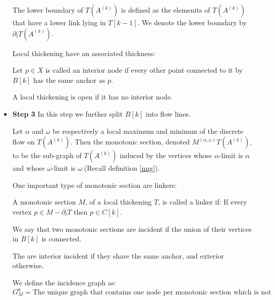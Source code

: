 \begin{itemize}
\begin{definition}
            The lower boundary of $T(A^{(k)})$
            is defined as the elemenits of $T(A^{(k)})$ that have a lower link lying in $T[k-1]$.
            We denote the lower boundary by $\partial_l T(A^{(k)})$.
        \end{definition}

        Local thickening have an associated thickness:

        \begin{definition}
            Let $p\in X$ is called an interior node if every other point connected 
            to it by $B[k]$ has the same anchor as $p$.

            A local thickening is open if it has no interior node.
        \end{definition}

    \item {\bf Step 3}
        In this step we further split $B[k]$ into flow lines.

        \begin{definition}
           Let $\alpha$ and $\omega$ be respectively a local maximum and minimun of 
            the discrete flow on $T(A^{(k)})$.
            Then the monotonic section, denoted $M^{
            (\alpha,\omega)
            }
            T(A^{(k)})$,
           to be the sub-graph of $T(A^{(k)})$ induced by the vertices whose
            $\alpha$-limit is $\alpha$ and whose $\omega$-limit is $\omega$.(Recall definition \ref{nng}).
        \end{definition}

        One important type of monotonic section are linkers:

        \begin{definition}[Linker]
            A monotonic section $M$, of a local thickening $T$, is called a linker if:
            If every vertex $p\in M-\partial_l T$ then $p\in C[k]$.
        \end{definition}
        
        
        \begin{definition}
            We say that two monotonic sections are incident if the
            union of their vertices in $B[k]$ is connected.

            The are interior incident if they share the same anchor,
            and exterior otherwise.

            We define the incidence graph as:
            $$
                G^k_M=
                \text{
                    The unique graph that contains one node per monotonic section which is not a linker,
                    and two incident monotonic sections are connected by an edge.
                }
            $$
        \end{definition}
        


\end{itemize}
